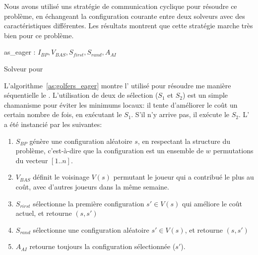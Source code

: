 Nous avons utilisé uns stratégie de communication cyclique pour résoudre ce problème, en échangeant la configuration courante entre deux solveurs avec des caractéristiques différentes. Les résultats montrent que cette stratégie marche très bien pour ce problème.

\begin{algorithm}
\dontprintsemicolon
\SetNoline
{}
   as\_eager\;
\algoindent {} : $I_{BP}, V_{BAS}, S_{first}, S_{rand}, A_{AI}$ \;
\caption{Solveur pour \SGP}\label{as:golfers_eager}
\end{algorithm}

L'algorithme~\ref{as:golfers_eager} montre l'\as{} utilisé pour résoudre me manière séquentielle le \SGP{}. L'utilisation de deux \ms{} de sélection ($S_1$ et $S_2$) est un simple chamanisme pour éviter les minimums locaux: il tente d'améliorer le coût un certain nombre de fois, en exécutant le \om{} $S_1$. S'il n'y arrive pas, il exécute le \om{} $S_2$. L'\as{} a été instancié par les \oms{} suivantes:

\begin{enumerate}
\item $S_{BP}$ génère une configuration aléatoire $s$, en respectant la structure du problème, c'est-à-dire que la configuration est un ensemble de $w$ permutations du vecteur $[1..n]$.
\item $V_{BAS}$ définit le voisinage $V \left(s\right)$ permutant le joueur qui a contribué le plus au coût, avec d'autres joueurs dans la même semaine.
\item $S_{rirst}$ sélectionne la première configuration $s'\in V\left (s\right)$ qui améliore le coût actuel, et retourne $(s, s')$
\item $S_{rand}$ sélectionne une configuration aléatoire $s'\in V\left(s\right)$, et retourne $(s, s')$
\item $A_{AI}$ retourne toujours la configuration sélectionnée ($s'$).
\end{enumerate}

